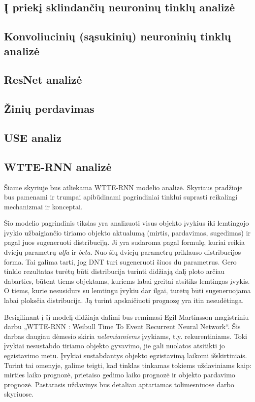 \documentclass{VUMIFPSkursinis}
\begin{document}
\subsection{Į priekį sklindančių neuroninų tinklų analizė}

\subsection{Konvoliucinių (sąsukinių) neuroninių tinklų analizė}

\subsection{ResNet analizė}

\subsection{Žinių perdavimas}

\subsection{USE analiz}


\subsection{WTTE-RNN analizė}

Šiame skyriuje bus atliekama WTTE-RNN modelio analizė. Skyriaus pradžioje bus pamenami ir trumpai apibūdinami pagrindiniai tinklui suprasti reikalingi mechanizmai ir konceptai. 

Šio modelio pagrindinis tikslas yra analizuoti visus objekto įvykius iki lemtingojo įvykio užbaigiančio tiriamo objekto aktualumą (mirtis, pardavimas, sugedimas) ir pagal juos sugeneruoti distribuciją. Ji yra sudaroma pagal formulę, kuriai reikia dviejų parametrų \textit{alfa} ir \textit{beta}. Nuo šių dviejų parametrų priklauso distribucijos forma. Tai galima tarti, jog DNT turi sugeneruoti šiuos du parametrus. Gero tinklo rezultatas turėtų būti distribucija turinti didžiają dalį ploto arčiau dabarties, būtent tiems objektams, kuriems labai greitai atsitiks lemtingas įvykis. O tiems, kurie nesusidurs su lemtingu įvykiu dar ilgai, turėtų būti sugeneruojama labai ploksčia distribucija.  Ją turint apskaičiuoti prognozę yra itin nesudėtinga.

Besigilinant į šį modelį didžiaja dalimi bus remimasi Egil Martinsson magistriniu darbu „WTTE-RNN : Weibull Time To Event Recurrent Neural Network“. Šis darbas daugiau dėmesio skiria \textit{nelemiamiems} įvykiams, t.y. rekurentiniams. Toki įvykiai nesustabdo tiriamo objekto gyvavimo, jie gali nuolatos atsitikti jo egzistavimo metu. Įvykiai sustabdantys objekto egzistavimą laikomi išskirtiniais. Turint tai omenyje, galime teigti, kad tinklas tinkamas tokiems uždaviniams kaip: mirties laiko prognozė, prietaiso gedimo laiko prognozė ir objekto pardavimo prognozė. Pastarasis uždavinys bus detaliau aptariamas tolimesniuose darbo skyriuose.
\end{document}
